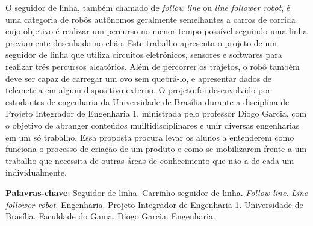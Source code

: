 \setlength{\absparsep}{18pt}
\begin{resumo}
  O seguidor de linha, também chamado de \textit{follow line} ou
  \textit{line follower robot}, é uma categoria de robôs autônomos geralmente
  semelhantes a carros de corrida cujo objetivo é realizar um percurso no menor
  tempo possível seguindo uma linha previamente desenhada no chão. Este trabalho
  apresenta o projeto de um seguidor de linha que utiliza circuitos eletrônicos,
  sensores e softwares para realizar três percursos aleatórios. Além de
  percorrer os trajetos, o robô também deve ser capaz de carregar um ovo sem
  quebrá-lo, e apresentar dados de telemetria em algum dispositivo externo. O
  projeto foi desenvolvido por estudantes de engenharia da Universidade de
  Brasília durante a disciplina de Projeto Integrador de Engenharia 1,
  ministrada pelo professor Diogo Garcia, com o objetivo de abranger conteúdos
  muiltidisciplinares e unir diversas engenharias em um só trabalho. Essa
  proposta procura levar os alunos a entenderem como funciona o processo de
  criação de um produto e como se mobilizarem frente a um trabalho que necessita
  de outras áreas de conhecimento que não a de cada um individualmente.

  \textbf{Palavras-chave}:
    Seguidor de linha. Carrinho seguidor de linha. \textit{Follow line}.
    \textit{Line follower robot}. Engenharia. Projeto Integrador de Engenharia
    1. Universidade de Brasília. Faculdade do Gama. Diogo Garcia. Engenharia.
\end{resumo}
